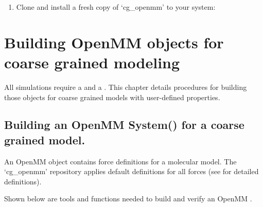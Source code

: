 \documentclass[letterpaper,12pt,english,openany,oneside]{sphinxmanual}
\begin{document}
\begin{enumerate}
\item {} 
Clone and install a fresh copy of ‘cg\_openmm’ to your system:

\begin{sphinxVerbatim}[commandchars=\\\{\}]
  
 
  
\end{sphinxVerbatim}

\end{enumerate}


\chapter{Building OpenMM objects for coarse grained modeling}
\label{\detokenize{build:building-openmm-objects-for-coarse-grained-modeling}}\label{\detokenize{build::doc}}
All  simulations require a  and a .  This chapter details procedures for building those objects for coarse grained models with user-defined properties.


\section{Building an OpenMM System() for a coarse grained model.}
\label{\detokenize{build:building-an-openmm-system-for-a-coarse-grained-model}}
An OpenMM  object contains force definitions for a molecular model.  The ‘cg\_openmm’ repository applies default definitions for all forces (see  for detailed definitions).

Shown below are tools and functions needed to build and verify an OpenMM  .

\newpage
\end{document}
